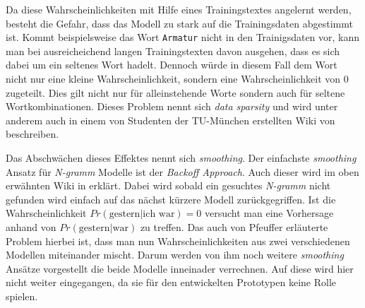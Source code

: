     Da diese Wahrscheinlichkeiten mit Hilfe eines Trainingstextes angelernt werden, besteht die Gefahr, dass das Modell zu stark auf die Trainingsdaten abgestimmt ist. Kommt beispielsweise das Wort \texttt{Armatur} nicht in den Trainigsdaten vor, kann man bei ausreicheichend langen Trainingstexten davon ausgehen, dass es sich dabei um ein seltenes Wort hadelt. Dennoch würde in diesem Fall dem Wort nicht nur eine kleine Wahrscheinlichkeit, sondern eine Wahrscheinlichkeit von 0 zugeteilt. Dies gilt nicht nur für alleinstehende Worte sondern auch für seltene Wortkombinationen. Dieses Problem nennt sich \emph{data sparsity} und wird unter anderem auch in einem von Studenten der TU-München erstellten Wiki von \parencite[Abs. 5]{recognize-speech:n-gramms} beschreiben. 
        
    Das Abschwächen dieses Effektes nennt sich \emph{smoothing}. Der einfachste \emph{smoothing} Ansatz für \emph{N-gramm} Modelle ist der \emph{Backoff Approach}. Auch dieser wird im oben erwähnten Wiki in \parencite{recognize-speech:backoff} erklärt. Dabei wird sobald ein gesuchtes \emph{N-gramm} nicht gefunden wird einfach auf das nächst kürzere Modell zurückgegriffen. Ist die Wahrscheinlichkeit \(Pr(\text{gestern}|\text{ich war}) = 0\) versucht man eine Vorhersage anhand von \(Pr(\text{gestern}|\text{war})\) zu treffen. Das auch von Pfeuffer erläuterte Problem hierbei ist, dass man nun Wahrscheinlichkeiten aus zwei verschiedenen Modellen miteinander mischt. Darum werden von ihm noch weitere \emph{smoothing} Ansätze vorgestellt die beide Modelle inneinader verrechnen. Auf diese wird hier nicht weiter eingegangen, da sie für den entwickelten Prototypen keine Rolle spielen.